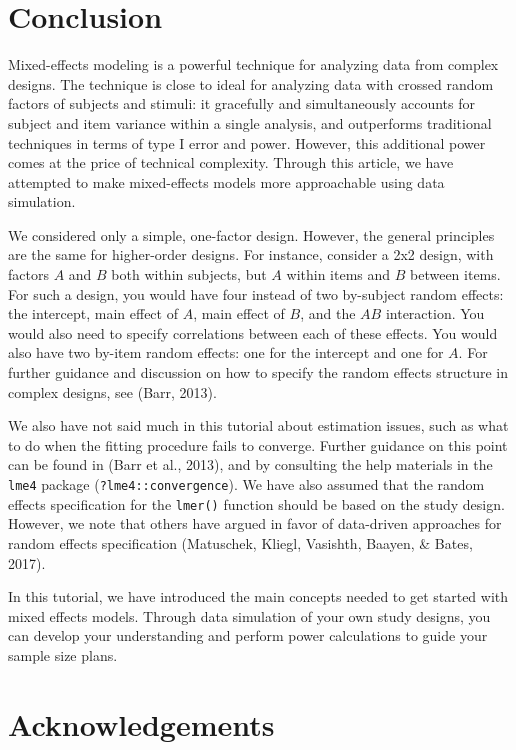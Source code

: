 \documentclass[doc,floatsintext]{apa6}
\begin{document}
\hypertarget{conclusion}{%
\section{Conclusion}\label{conclusion}}

Mixed-effects modeling is a powerful technique for analyzing data from complex designs. The technique is close to ideal for analyzing data with crossed random factors of subjects and stimuli: it gracefully and simultaneously accounts for subject and item variance within a single analysis, and outperforms traditional techniques in terms of type I error and power. However, this additional power comes at the price of technical complexity. Through this article, we have attempted to make mixed-effects models more approachable using data simulation.

We considered only a simple, one-factor design. However, the general principles are the same for higher-order designs. For instance, consider a 2x2 design, with factors \(A\) and \(B\) both within subjects, but \(A\) within items and \(B\) between items. For such a design, you would have four instead of two by-subject random effects: the intercept, main effect of \(A\), main effect of \(B\), and the \(AB\) interaction. You would also need to specify correlations between each of these effects. You would also have two by-item random effects: one for the intercept and one for \(A\). For further guidance and discussion on how to specify the random effects structure in complex designs, see (Barr, 2013).

We also have not said much in this tutorial about estimation issues, such as what to do when the fitting procedure fails to converge. Further guidance on this point can be found in (Barr et al., 2013), and by consulting the help materials in the \texttt{lme4} package (\texttt{?lme4::convergence}). We have also assumed that the random effects specification for the \texttt{lmer()} function should be based on the study design. However, we note that others have argued in favor of data-driven approaches for random effects specification (Matuschek, Kliegl, Vasishth, Baayen, \& Bates, 2017).

In this tutorial, we have introduced the main concepts needed to get started with mixed effects models. Through data simulation of your own study designs, you can develop your understanding and perform power calculations to guide your sample size plans.

\hypertarget{acknowledgements}{%
\section{Acknowledgements}\label{acknowledgements}}
\end{document}

